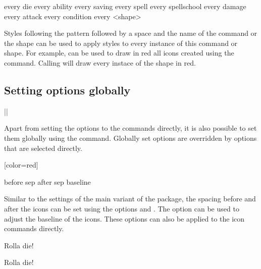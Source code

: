 \documentclass[a4paper]{article}
\begin{document}
\begin{macrodef}
every die
every ability
every saving
every spell
every spellschool
every damage
every attack
every condition
every <shape>
\end{macrodef}
Styles following the pattern  followed by a space and the name of the command or the shape can be used to apply styles to every instance of this command or shape. For example,  can be used to draw in red all icons created using the \macro{\die} command. Calling  will draw every instace of the  shape in red.

\subsection{Setting options globally}

\begin{macrodef}
|\dndiconsset|
\end{macrodef}
Apart from setting the options to the commands directly, it is also possible to set them globally using the \macro{\dndiconsset} command. Globally set options are overridden by options that are selected directly.

\begin{codeexample}

[color=red]
\end{codeexample}

\begin{macrodef}
before sep
after sep
baseline
\end{macrodef}
Similar to the settings of the main variant of the package, the spacing before and after the icons can be set using the options  and . The option  can be used to adjust the baseline of the icons. These options can also be applied to the icon commands directly.

\begin{codeexample}
Rolla die!

Rolla die!
\end{codeexample}

\printchanges
\end{document}
